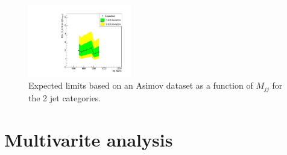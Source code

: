 \begin{figure}[!htbp]
\centering
\includegraphics[width=0.4\textwidth]{chapter6/Tuning/vbf_vbfvbfMass.pdf}
\caption{Expected limits based on an Asimov dataset as a function of $M_{jj}$ for the 2 jet categories.}
\label{fig:optVBFmass}
\end{figure}





\section{Multivarite analysis}

